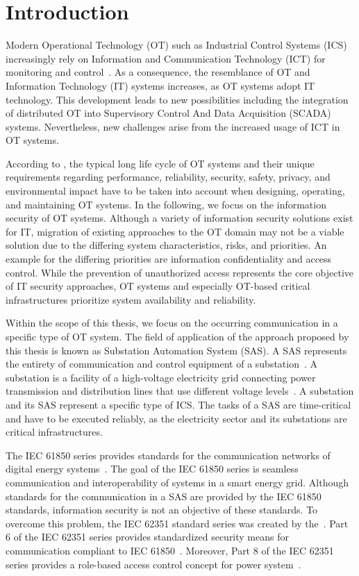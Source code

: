 \chapter{Introduction}
\label{ch:introduction}
Modern Operational Technology (OT) such as Industrial Control Systems (ICS) increasingly rely on Information and Communication Technology (ICT) for monitoring and control~\cite{Stouffer2023}.
As a consequence, the resemblance of OT and Information Technology (IT) systems increases, as OT systems adopt IT technology.
This development leads to new possibilities including the integration of distributed OT into Supervisory Control And Data Acquisition (SCADA) systems.
Nevertheless, new challenges arise from the increased usage of ICT in OT systems.

According to \citeauthor{Stouffer2023} \cite{Stouffer2023}, the typical long life cycle of OT systems and their unique requirements regarding performance, reliability, security, safety, privacy, and environmental impact have to be taken into account when designing, operating, and maintaining OT systems.
In the following, we focus on the information security of OT systems.
Although a variety of information security solutions exist for IT, migration of existing approaches to the OT domain may not be a viable solution due to the differing system characteristics, risks, and priorities.
An example for the differing priorities are information confidentiality and access control.
While the prevention of unauthorized access represents the core objective of IT security approaches, OT systems and especially OT-based critical infrastructures prioritize system availability and reliability.

Within the scope of this thesis, we focus on the occurring communication in a specific type of OT system.
The field of application of the approach proposed by this thesis is known as Substation Automation System (SAS).
A SAS represents the entirety of communication and control equipment of a substation~\cite{Padilla2015}.
A substation is a facility of a high-voltage electricity grid connecting power transmission and distribution lines that use different voltage levels~\cite{oshaSubstation}.
A substation and its SAS represent a specific type of ICS.
The tasks of a SAS are time-critical and have to be executed reliably, as the electricity sector and its substations are critical infrastructures.

The IEC 61850 series provides standards for the communication networks of digital energy systems~\cite{IEC61850P5}.
The goal of the IEC 61850 series is seamless communication and interoperability of systems in a smart energy grid.
Although standards for the communication in a SAS are provided by the IEC 61850 standards, information security is not an objective of these standards.
To overcome this problem, the IEC 62351 standard series was created by the~\citeauthor{IEC62351P6}.
Part 6 of the IEC 62351 series provides standardized security means for communication compliant to IEC 61850~\cite{IEC62351P6}.
Moreover, Part 8 of the IEC 62351 series provides a role-based access control concept for power system~\cite{IEC62351P8}.

